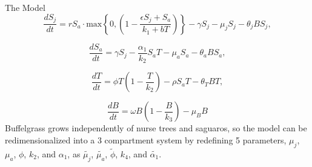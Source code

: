 \documentclass{beamer}
\begin{document}
\begin{frame}{The Model}
\begin{equation*}
\displaystyle\frac{dS_j}{dt}= rS_a\cdot \text{max}\left\lbrace0,\left(1-\displaystyle\frac{\epsilon S_j + S_a}{k_1+b T}\right) \right\rbrace - \gamma S_j - \mu_j S_j - \theta_j B S_j ,
\end{equation*}

\begin{equation*}
\displaystyle\frac{dS_a}{dt} = \gamma S_j -\displaystyle\frac{\alpha_1}{k_2}S_a T - \mu_a S_a - \theta_a B S_a ,
\end{equation*}

\begin{equation*} \label{eqBuffel}
\displaystyle\frac{dT}{dt} = \phi T\left(1 - \displaystyle\frac{T}{k_2}\right) - \rho S_a T - \theta_T B T ,
\end{equation*}

\begin{equation*}
\displaystyle\frac{dB}{dt} =\omega B \left(1-\displaystyle\frac{B}{k_3}\right) - \mu_B B
\end{equation*}
{\small Buffelgrass grows independently of nurse trees and saguaros, so the model can be redimensionalized into a 3 compartment system by redefining 5 parameters, $\mu_j$, $\mu_a$, $\phi$, $k_2$, and $\alpha_1$,  as $\tilde{\mu_j}$, $\tilde{\mu_a}$, $\tilde{\phi}$, $k_4$, and $\tilde{\alpha_1}$.}
\end{frame}
\end{document}
